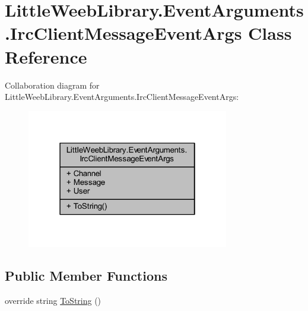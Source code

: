 \hypertarget{class_little_weeb_library_1_1_event_arguments_1_1_irc_client_message_event_args}{}\section{Little\+Weeb\+Library.\+Event\+Arguments.\+Irc\+Client\+Message\+Event\+Args Class Reference}
\label{class_little_weeb_library_1_1_event_arguments_1_1_irc_client_message_event_args}


Collaboration diagram for Little\+Weeb\+Library.\+Event\+Arguments.\+Irc\+Client\+Message\+Event\+Args\+:\nopagebreak
\begin{figure}[H]
\begin{center}
\leavevmode
\includegraphics[width=250pt]{class_little_weeb_library_1_1_event_arguments_1_1_irc_client_message_event_args__coll__graph}
\end{center}
\end{figure}
\subsection*{Public Member Functions}
\begin{DoxyCompactItemize}
\item 
override string \mbox{\hyperlink{class_little_weeb_library_1_1_event_arguments_1_1_irc_client_message_event_args_a0b8df2a044d27dec2dd963e978311be4}{To\+String}} ()
\end{DoxyCompactItemize}
